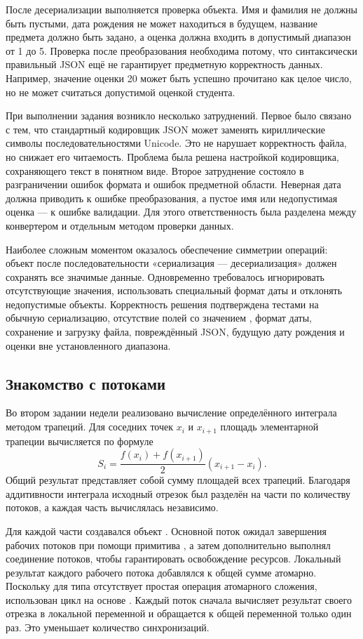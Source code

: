 После десериализации выполняется проверка объекта. Имя и фамилия не должны быть пустыми, дата рождения не может находиться в будущем, название предмета должно быть задано, а оценка должна входить в допустимый диапазон от 1 до 5. Проверка после преобразования необходима потому, что синтаксически правильный JSON ещё не гарантирует предметную корректность данных. Например, значение оценки 20 может быть успешно прочитано как целое число, но не может считаться допустимой оценкой студента.

При выполнении задания возникло несколько затруднений. Первое было связано с тем, что стандартный кодировщик JSON может заменять кириллические символы последовательностями Unicode. Это не нарушает корректность файла, но снижает его читаемость. Проблема была решена настройкой кодировщика, сохраняющего текст в понятном виде. Второе затруднение состояло в разграничении ошибок формата и ошибок предметной области. Неверная дата должна приводить к ошибке преобразования, а пустое имя или недопустимая оценка --- к ошибке валидации. Для этого ответственность была разделена между конвертером и отдельным методом проверки данных.

Наиболее сложным моментом оказалось обеспечение симметрии операций: объект после последовательности «сериализация --- десериализация» должен сохранять все значимые данные. Одновременно требовалось игнорировать отсутствующие значения, использовать специальный формат даты и отклонять недопустимые объекты. Корректность решения подтверждена тестами на обычную сериализацию, отсутствие полей со значением , формат даты, сохранение и загрузку файла, повреждённый JSON, будущую дату рождения и оценки вне установленного диапазона.

\subsection{Знакомство с потоками}

Во втором задании недели реализовано вычисление определённого интеграла методом трапеций. Для соседних точек $x_i$ и $x_{i+1}$ площадь элементарной трапеции вычисляется по формуле
\[
    S_i = \frac{f(x_i)+f(x_{i+1})}{2}(x_{i+1}-x_i).
\]
Общий результат представляет собой сумму площадей всех трапеций. Благодаря аддитивности интеграла исходный отрезок был разделён на части по количеству потоков, а каждая часть вычислялась независимо.

Для каждой части создавался объект  \cite{threads}. Основной поток ожидал завершения рабочих потоков при помощи примитива  \cite{barrier}, а затем дополнительно выполнял соединение потоков, чтобы гарантировать освобождение ресурсов. Локальный результат каждого рабочего потока добавлялся к общей сумме атомарно. Поскольку для типа  отсутствует простая операция атомарного сложения, использован цикл на основе  \cite{interlocked}. Каждый поток сначала вычисляет результат своего отрезка в локальной переменной и обращается к общей переменной только один раз. Это уменьшает количество синхронизаций.

